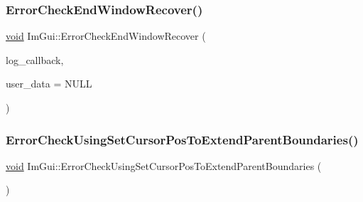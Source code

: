 \mbox{\label{namespaceImGui_a945392cbf05b9434df8ec3630b10e01a}} 
\subsubsection{\texorpdfstring{Error\+Check\+End\+Window\+Recover()}{ErrorCheckEndWindowRecover()}}
{\footnotesize\ttfamily \hyperlink{imgui__impl__opengl3__loader_8h_ac668e7cffd9e2e9cfee428b9b2f34fa7}{void} Im\+Gui\+::\+Error\+Check\+End\+Window\+Recover (\begin{DoxyParamCaption}\item[{\hyperlink{imgui__internal_8h_af128655e687b027c18655e3bfde4b11e}{Im\+Gui\+Error\+Log\+Callback}}]{log\+\_\+callback,  }\item[{\hyperlink{imgui__impl__opengl3__loader_8h_ac668e7cffd9e2e9cfee428b9b2f34fa7}{void} $\ast$}]{user\+\_\+data = {\ttfamily NULL} }\end{DoxyParamCaption})}

\mbox{\label{namespaceImGui_ad5832500c14abd9e76e376b82701385b}} 
\subsubsection{\texorpdfstring{Error\+Check\+Using\+Set\+Cursor\+Pos\+To\+Extend\+Parent\+Boundaries()}{ErrorCheckUsingSetCursorPosToExtendParentBoundaries()}}
{\footnotesize\ttfamily \hyperlink{imgui__impl__opengl3__loader_8h_ac668e7cffd9e2e9cfee428b9b2f34fa7}{void} Im\+Gui\+::\+Error\+Check\+Using\+Set\+Cursor\+Pos\+To\+Extend\+Parent\+Boundaries (\begin{DoxyParamCaption}{ }\end{DoxyParamCaption})}

\mbox{\label{namespaceImGui_a310ff87cbe678e2c632bf1f5577a7fbd}} 
